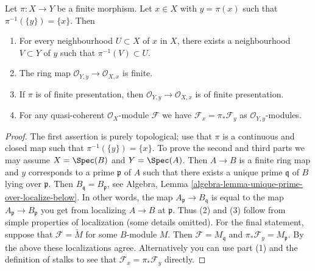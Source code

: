 \begin{lemma}
\label{lemma-finite-morphism-single-point-in-fibre}
Let $\pi : X \to Y$ be a finite morphism.
Let $x \in X$ with $y = \pi(x)$ such that $\pi^{-1}(\{y\}) = \{x\}$.
Then
\begin{enumerate}
\item For every neighbourhood $U \subset X$ of $x$ in $X$, there
exists a neighbourhood $V \subset Y$ of $y$ such that
$\pi^{-1}(V) \subset U$.
\item The ring map $\mathcal{O}_{Y, y} \to \mathcal{O}_{X, x}$
is finite.
\item If $\pi$ is of finite presentation, then
$\mathcal{O}_{Y, y} \to \mathcal{O}_{X, x}$ is of finite presentation.
\item For any quasi-coherent $\mathcal{O}_X$-module $\mathcal{F}$
we have $\mathcal{F}_x = \pi_*\mathcal{F}_y$ as
$\mathcal{O}_{Y, y}$-modules.
\end{enumerate}
\end{lemma}

\begin{proof}
The first assertion is purely topological; use that
$\pi$ is a continuous and closed map such that $\pi^{-1}(\{y\}) = \{x\}$.
To prove the second and third parts we may assume
$X = \Spec(B)$ and $Y = \Spec(A)$. Then
$A \to B$ is a finite ring map and $y$ corresponds to a prime
$\mathfrak p$ of $A$ such that there exists a unique prime $\mathfrak q$ of
$B$ lying over $\mathfrak p$. Then
$B_{\mathfrak q} = B_{\mathfrak p}$, see
Algebra, Lemma \ref{algebra-lemma-unique-prime-over-localize-below}.
In other words, the map $A_{\mathfrak p} \to B_{\mathfrak q}$
is equal to the map $A_{\mathfrak p} \to B_{\mathfrak p}$ you get
from localizing $A \to B$ at $\mathfrak p$.
Thus (2) and (3) follow from simple properties of localization
(some details omitted). For the final statement, suppose that
$\mathcal{F} = \widetilde M$ for some $B$-module $M$.
Then $\mathcal{F} = M_{\mathfrak q}$ and
$\pi_*\mathcal{F}_y = M_{\mathfrak p}$. By the above these
localizations agree. Alternatively you can use part (1) and
the definition of stalks to see that $\mathcal{F}_x = \pi_*\mathcal{F}_y$
directly.
\end{proof}
